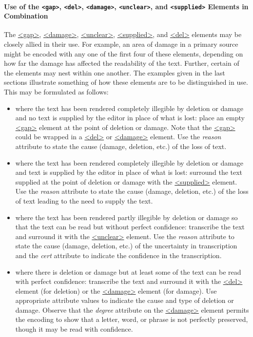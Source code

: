 \paragraph[{Use of the gap, del, damage, unclear, and supplied Elements in Combination}]{Use of the \texttt{<gap>}, \texttt{<del>}, \texttt{<damage>}, \texttt{<unclear>}, and \texttt{<supplied>} Elements in Combination}\label{PHCOMB}\par
The \hyperref[TEI.gap]{<gap>}, \hyperref[TEI.damage]{<damage>}, \hyperref[TEI.unclear]{<unclear>}, \hyperref[TEI.supplied]{<supplied>}, and \hyperref[TEI.del]{<del>} elements may be closely allied in their use. For example, an area of damage in a primary source might be encoded with any one of the first four of these elements, depending on how far the damage has affected the readability of the text. Further, certain of the elements may nest within one another. The examples given in the last sections illustrate something of how these elements are to be distinguished in use. This may be formulated as follows: \begin{itemize}
\item where the text has been rendered completely illegible by deletion or damage and no text is supplied by the editor in place of what is lost: place an empty \hyperref[TEI.gap]{<gap>} element at the point of deletion or damage. Note that the \hyperref[TEI.gap]{<gap>} could be wrapped in a \hyperref[TEI.del]{<del>} or \hyperref[TEI.damage]{<damage>} element. Use the {\itshape reason} attribute to state the cause (damage, deletion, etc.) of the loss of text.
\item where the text has been rendered completely illegible by deletion or damage and text is supplied by the editor in place of what is lost: surround the text supplied at the point of deletion or damage with the \hyperref[TEI.supplied]{<supplied>} element. Use the {\itshape reason} attribute to state the cause (damage, deletion, etc.) of the loss of text leading to the need to supply the text.
\item where the text has been rendered partly illegible by deletion or damage so that the text can be read but without perfect confidence: transcribe the text and surround it with the \hyperref[TEI.unclear]{<unclear>} element. Use the {\itshape reason} attribute to state the cause (damage, deletion, etc.) of the uncertainty in transcription and the {\itshape cert} attribute to indicate the confidence in the transcription.
\item where there is deletion or damage but at least some of the text can be read with perfect confidence: transcribe the text and surround it with the \hyperref[TEI.del]{<del>} element (for deletion) or the \hyperref[TEI.damage]{<damage>} element (for damage). Use appropriate attribute values to indicate the cause and type of deletion or damage. Observe that the {\itshape degree} attribute on the \hyperref[TEI.damage]{<damage>} element permits the encoding to show that a letter, word, or phrase is not perfectly preserved, though it may be read with confidence.

\end{itemize}
